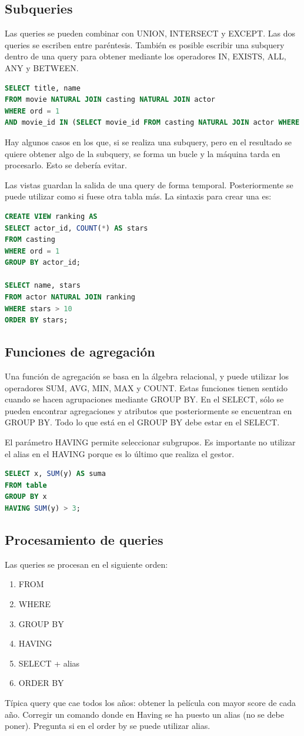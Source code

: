 \subsection{Subqueries}
Las queries se pueden combinar con UNION, INTERSECT y EXCEPT. Las dos queries se escriben entre paréntesis. También es posible escribir una subquery dentro de una query para obtener mediante los operadores IN, EXISTS, ALL, ANY y BETWEEN.
\begin{lstlisting}[language=SQL]
SELECT title, name
FROM movie NATURAL JOIN casting NATURAL JOIN actor
WHERE ord = 1
AND movie_id IN (SELECT movie_id FROM casting NATURAL JOIN actor WHERE name = 'Julie Andrews')
\end{lstlisting}

Hay algunos casos en los que, si se realiza una subquery, pero en el resultado se quiere obtener algo de la subquery, se forma un bucle y la máquina tarda en procesarlo. Esto se debería evitar. 

Las vistas guardan la salida de una query de forma temporal. Posteriormente se puede utilizar como si fuese otra tabla más. La sintaxis para crear una es:
\begin{lstlisting}[language=SQL]
CREATE VIEW ranking AS
SELECT actor_id, COUNT(*) AS stars
FROM casting
WHERE ord = 1
GROUP BY actor_id;

SELECT name, stars
FROM actor NATURAL JOIN ranking
WHERE stars > 10
ORDER BY stars; 
\end{lstlisting}

\subsection{Funciones de agregación}
Una función de agregación se basa en la álgebra relacional, y puede utilizar los operadores SUM, AVG, MIN, MAX y COUNT. Estas funciones tienen sentido cuando se hacen agrupaciones mediante GROUP BY. En el SELECT, sólo se pueden encontrar agregaciones y atributos que posteriormente se encuentran en GROUP BY. Todo lo que está en el GROUP BY debe estar en el SELECT.

El parámetro HAVING permite seleccionar subgrupos. Es importante no utilizar el alias en el HAVING porque es lo último que realiza el gestor.
\begin{lstlisting}[language=SQL]
SELECT x, SUM(y) AS suma
FROM table
GROUP BY x
HAVING SUM(y) > 3;
\end{lstlisting}

\subsection{Procesamiento de queries}
Las queries se procesan en el siguiente orden:
\begin{enumerate}
\item FROM
\item WHERE
\item GROUP BY
\item HAVING
\item SELECT + alias
\item ORDER BY
\end{enumerate}

Típica query que cae todos los años: obtener la película con mayor score de cada año. Corregir un comando donde en Having se ha puesto un alias (no se debe poner). Pregunta si en el order by se puede utilizar alias.
